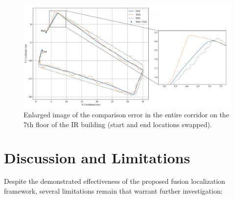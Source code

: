 \documentclass[12pt,a4paper]{article}
\numberwithin{equation}{section}
\begin{document}
\begin{figure}[H]
    \centering
    \includegraphics[width=\linewidth]{Amplification images/wifi/full_circle_inverse.png}
    \caption{Enlarged image of the comparison error in the entire corridor on the 7th floor of the IR building (start and end locations swapped).}
    \label{fig:error_7_inverse}
\end{figure}
\section{Discussion and Limitations}
Despite the demonstrated effectiveness of the proposed fusion localization framework, several limitations remain that warrant further investigation:
\end{document}
